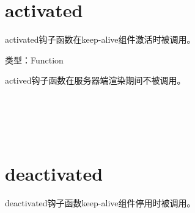 \section{activated}


activated钩子函数在keep-alive组件激活时被调用。


\begin{compactitem}
\item 类型：Function
\end{compactitem}

actived钩子函数在服务器端渲染期间不被调用。






\begin{lstlisting}[language=JavaScript]

\end{lstlisting}




\begin{lstlisting}[language=JavaScript]

\end{lstlisting}




\begin{lstlisting}[language=JavaScript]

\end{lstlisting}




\begin{lstlisting}[language=JavaScript]

\end{lstlisting}




\begin{lstlisting}[language=JavaScript]

\end{lstlisting}




\begin{lstlisting}[language=JavaScript]

\end{lstlisting}






\section{deactivated}



deactivated钩子函数keep-alive组件停用时被调用。


